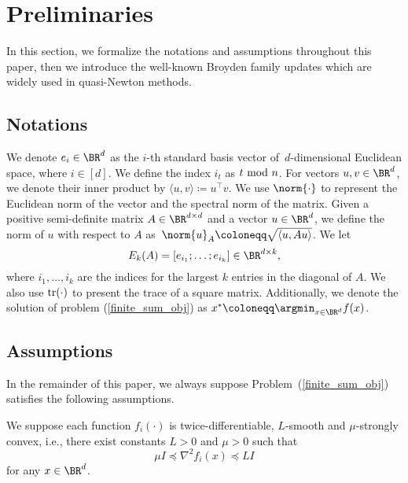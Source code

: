 \section{Preliminaries}\label{sec:notations}
In this section, we formalize the notations and assumptions throughout this paper, then we introduce the well-known Broyden family updates which are widely used in quasi-Newton methods.

\subsection{Notations} 
We denote $e_i \in \BR^d$ as the $i$-th standard basis vector of~$d$-dimensional Euclidean space, where $i\in[d]$. 
We define the index $i_t$ as $t~{\rm mod}~n$. 
For vectors $u, v \in \BR^d$, we denote their inner product by $\langle u, v \rangle \coloneqq u^{\top} v$.
We use $\norm{\cdot}$ to represent the Euclidean norm of the vector and the spectral norm of the matrix. 
Given a positive semi-definite matrix $A\in\BR^{d\times d}$ and a vector $u\in\BR^d$, we define the norm of $u$ with respect to $A$ as~$\norm{u}_{A} \coloneqq \sqrt{\langle u, A u\rangle}$.
We let
\begin{equation}
    E_k(A) = [e_{i_1} ; \ldots; e_{i_k}] \in \BR^{d\times k},
    \label{largest_k_def}
\end{equation}
where $i_1, \ldots, i_k$ are the indices for the largest $k$ entries in the diagonal of $A$.
We also use ${\rm tr}(\cdot)$ to present the trace of a square matrix.
Additionally, we denote the solution of problem (\ref{finite_sum_obj}) as $x^*\coloneqq\argmin_{x\in\BR^d}f(x)$.

\subsection{Assumptions}

In the remainder of this paper, we always suppose Problem~(\ref{finite_sum_obj}) satisfies the following assumptions.

\begin{assumption}\label{convex_assumption}
We suppose each function $f_i(\cdot)$ is twice-differentiable, $L$-smooth and $\mu$-strongly convex, i.e., there exist constants $L > 0$ and $\mu > 0$ such that 
\begin{equation}\label{eq:strong_convex}
    \mu I \preceq \nabla^2 f_i (x) \preceq L I  
\end{equation}
for any $x\in\BR^d$.
\end{assumption}

